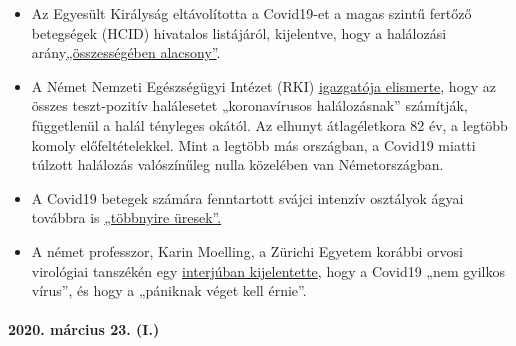 \begin{itemize}
\tightlist
\item
  Az Egyesült Királyság eltávolította a Covid19-et a magas szintű
  fertőző betegségek (HCID) hivatalos listájáról, kijelentve, hogy a
  halálozási
  arány\href{https://www.gov.uk/guidance/high-consequence-infectious-diseases-hcid\#status-of-covid-19}{„összességében
  alacsony''}.
\item
  A Német Nemzeti Egészségügyi Intézet (RKI)
  \href{https://swprs.org/rki-relativiert-corona-todesfaelle/}{igazgatója
  elismerte}, hogy az összes teszt-pozitív halálesetet „koronavírusos
  halálozásnak'' számítják, függetlenül a halál tényleges okától. Az
  elhunyt átlagéletkora 82 év, a legtöbb komoly előfeltételekkel. Mint a
  legtöbb más országban, a Covid19 miatti túlzott halálozás valószínűleg
  nulla közelében van Németországban.
\item
  A Covid19 betegek számára fenntartott svájci intenzív osztályok ágyai
  továbbra is
  \href{https://www.aargauerzeitung.ch/aargau/kanton-aargau/erst-3-von-100-aargauer-betten-der-intensivstationen-sind-belegt-so-ruesten-sich-die-spitaeler-auf-die-epidemie-137332716}{„többnyire
  üresek''.}
\item
  A német professzor, Karin Moelling, a Zürichi Egyetem korábbi orvosi
  virológiai tanszékén egy
  \href{https://www.radioeins.de/programm/sendungen/die_profis/archivierte_sendungen/beitraege/corona-virus-kein-killervirus.html}{interjúban
  kijelentette}, hogy a Covid19 „nem gyilkos vírus'', és hogy a
  „pániknak véget kell érnie''.
\end{itemize}

\hypertarget{2020-muxe1rcius-23-i}{%
\paragraph{2020. március 23. (I.)}\label{2020-muxe1rcius-23-i}}

